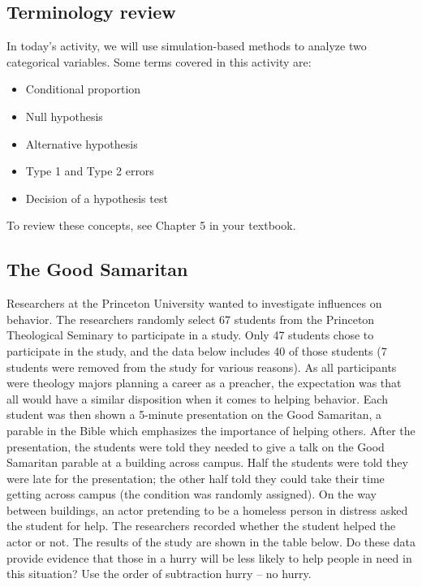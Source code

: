\documentclass[
]{report}
\begin{document}
\hypertarget{terminology-review-15}{%
\subsection{Terminology review}\label{terminology-review-15}}

In today's activity, we will use simulation-based methods to analyze two categorical variables. Some terms covered in this activity are:

\begin{itemize}
\item
  Conditional proportion
\item
  Null hypothesis
\item
  Alternative hypothesis
\item
  Type 1 and Type 2 errors
\item
  Decision of a hypothesis test
\end{itemize}

To review these concepts, see Chapter 5 in your textbook.

\hypertarget{the-good-samaritan}{%
\subsection{The Good Samaritan}\label{the-good-samaritan}}

Researchers at the Princeton University wanted to investigate influences on behavior. The researchers randomly select 67 students from the Princeton Theological Seminary to participate in a study. Only 47 students chose to participate in the study, and the data below includes 40 of those students (7 students were removed from the study for various reasons). As all participants were theology majors planning a career as a preacher, the expectation was that all would have a similar disposition when it comes to helping behavior. Each student was then shown a 5-minute presentation on the Good Samaritan, a parable in the Bible which emphasizes the importance of helping others. After the presentation, the students were told they needed to give a talk on the Good Samaritan parable at a building across campus. Half the students were told they were late for the presentation; the other half told they could take their time getting across campus (the condition was randomly assigned). On the way between buildings, an actor pretending to be a homeless person in distress asked the student for help. The researchers recorded whether the student helped the actor or not. The results of the study are shown in the table below. Do these data provide evidence that those in a hurry will be less likely to help people in need in this situation? Use the order of subtraction hurry -- no hurry.
\end{document}
